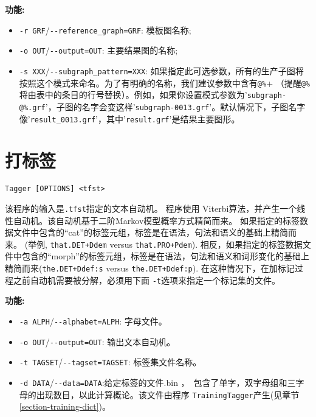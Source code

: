 \bigskip
\noindent \textbf{功能:}
\begin{itemize}
\item \verb+-r GRF+/\verb+--reference_graph=GRF+: 模板图名称;
  
\item \verb+-o OUT+/\verb+--output=OUT+: 主要结果图的名称;
  
  \item \verb+-s XXX+/\verb+--subgraph_pattern=XXX+: 
  如果指定此可选参数，所有的生产子图将按照这个模式来命名。为了有明确的名称，我们建议参数中含有\verb+@%++ 
  （提醒\verb+@%+将由表中的条目的行号替换）。例如，如果你设置模式参数为'\verb+subgraph-@%.grf+'，子图的名字会变这样'\verb+subgraph-0013.grf+'。默认情况下，子图名字像'\verb+result_0013.grf+'，其中'\verb+result.grf+'是结果主要图形。
  
\end{itemize}




\section{打标签}
\verb+Tagger [OPTIONS] <tfst>+
\label{section-Tagger}

\bigskip
\noindent 该程序的输入是\verb+.tfst+指定的文本自动机。 程序使用 Viterbi算法，并产生一个线性自动机。该自动机基于二阶Markov模型概率方式精简而来。 如果指定的标签数据文件中包含的“cat”的标签元组，标签是在语法，句法和语义的基础上精简而来。 (举例, \verb$that.DET+Ddem$ versus 
	\verb$that.PRO+Pdem$). 相反，如果指定的标签数据文件中包含的“morph”的标签元组，标签是在语法，句法和语义和词形变化的基础上精简而来(\verb$the.DET+Ddef:s$ versus \verb$the.DET+Ddef:p$). 在这种情况下，在加标记过程之前自动机需要被分解，必须用下面 \verb+-t+选项来指定一个标记集的文件。

\bigskip
\noindent \textbf{功能:}
\begin{itemize}
\item \verb+-a ALPH+/\verb+--alphabet=ALPH+: 字母文件。
\item \verb+-o OUT+/\verb+--output=OUT+: 输出文本自动机。
  \item \verb+-t TAGSET+/\verb+--tagset=TAGSET+: 标签集文件名称。
  \item \verb+-d DATA+/\verb+--data=DATA+:给定标签的文件.bin ， 包含了单字，双字母组和三字母的出现数目，以此计算概论。该文件由程序 \verb+TrainingTagger+产生(见章节 \ref{section-training-dict})。
\end{itemize}





